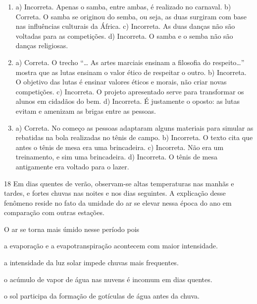 \begin{enumerate}

\item
a) Incorreta. Apenas o samba, entre ambas, é realizado no carnaval.
b) Correta. O samba se originou do semba, ou seja, as duas
surgiram com base nas influências culturais da África.
c) Incorreta. As duas danças não são voltadas para as
competições.
d) Incorreta. O samba e o semba não são danças religiosas.

\item
a) Correta. O trecho “\ldots{} As artes marciais ensinam a filosofia
do respeito\ldots{}” mostra que as lutas ensinam o valor ético de respeitar
o outro.
b) Incorreta. O objetivo das lutas é ensinar valores éticos e
morais, não criar novas competições.
c) Incorreta. O projeto apresentado serve para transformar os alunos
em cidadãos do bem.
d) Incorreta. É justamente o oposto: as lutas
evitam e amenizam as brigas entre as pessoas.

\item
a) Correta. No começo as pessoas adaptaram alguns materiais para
simular as rebatidas na bola realizadas no tênis de campo.
b) Incorreta. O texto cita que antes o tênis de mesa era uma
brincadeira.
c) Incorreta. Não era um treinamento, e sim uma brincadeira.
d) Incorreta. O tênis de mesa antigamente era voltado para o
lazer.
\end{enumerate}

\num{18} Em dias quentes de verão, observam-se altas temperaturas
nas manhãs e tardes, e fortes chuvas nas noites e nos dias seguintes. A
explicação desse fenômeno reside no fato da umidade do ar se elevar
nessa época do ano em comparação com outras estações.

O ar se torna mais úmido nesse período pois

\begin{escolha}
\item a evaporação e a evapotranspiração acontecem com maior intensidade.

\item a intensidade da luz solar impede chuvas mais frequentes.

\item o acúmulo de vapor de água nas nuvens é incomum em dias quentes.

\item o sol participa da formação de gotículas de água antes da chuva.
\end{escolha}


